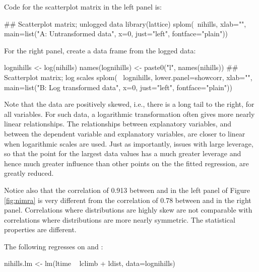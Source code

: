 Code for the scatterplot matrix in the left panel is:
\begin{Schunk}
\begin{Sinput}
## Scatterplot matrix; unlogged data
library(lattice)
splom(~nihills,  xlab="",
       main=list("A: Untransformed data", x=0,
       just="left", fontface="plain"))
\end{Sinput}
\end{Schunk}

For the right panel, create a data frame from the logged data:
\begin{Schunk}
\begin{Sinput}
lognihills <- log(nihills)
names(lognihills) <- paste0("l", names(nihills))
## Scatterplot matrix; log scales
splom(~ lognihills, lower.panel=showcorr, xlab="",
       main=list("B: Log transformed data", x=0,
       just="left", fontface="plain"))
\end{Sinput}
\end{Schunk}

Note that the data are positively skewed, i.e., there is a long tail
to the right, for all variables. For such data, a logarithmic
transformation often gives more nearly linear relationships.  The
relationships between explanatory variables, and between the dependent
variable and explanatory variables, are closer to linear when
logarithmic scales are used.  Just as importantly, issues with large
leverage, so that the point for the largest data values has a much
greater leverage and hence much greater influence than other points on
the the fitted regression, are greatly reduced.

Notice also that the correlation of 0.913 between  and
 in the left panel of Figure \ref{fig:nimra} is very
different from the correlation of 0.78 between  and
 in the right panel. Correlations where distributions are
highly skew are not comparable with correlations where distributions
are more nearly symmetric.  The statistical properties are different.


The following regresses  on  and
:
\begin{Schunk}
\begin{Sinput}
nihills.lm <- lm(ltime ~ lclimb + ldist,
                 data=lognihills)
\end{Sinput}
\end{Schunk}

